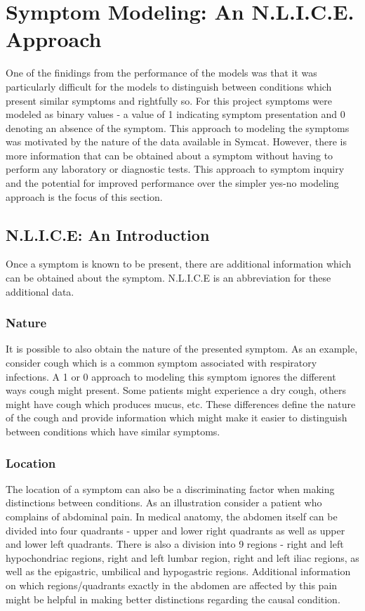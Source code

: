 \chapter{Symptom Modeling: An N.L.I.C.E. Approach} \label{appendix: b}

One of the finidings from the performance of the models was that it was particularly difficult for the models to distinguish between conditions which present similar symptoms and rightfully so. For this project symptoms were modeled as binary values - a value of 1 indicating symptom presentation and 0 denoting an absence of the symptom. This approach to modeling the symptoms was motivated by the nature of the data available in Symcat. However, there is more information that can be obtained about a symptom without having to perform any laboratory or diagnostic tests. This approach to symptom  inquiry and the potential for improved performance over the simpler yes-no modeling approach is the focus of this section.

\section{N.L.I.C.E: An Introduction}

Once a symptom is known to be present, there are additional information which can be obtained  about the symptom. N.L.I.C.E is an abbreviation for these additional data.

\subsection * {Nature}

It is possible to also obtain the nature of the presented symptom. As an example, consider cough which is a common symptom associated with respiratory infections. A 1 or 0 approach to modeling this symptom ignores the different ways cough might present. Some patients might experience a dry cough, others might have cough which produces mucus, etc. These differences define the nature of the cough and provide information which might make it easier to distinguish between conditions which have similar symptoms.

\subsection* {Location}

The location of a symptom can also be a discriminating factor when making distinctions between conditions. As an illustration consider a patient who complains of abdominal pain. In medical anatomy, the abdomen itself can be divided into four quadrants - upper and lower right quadrants as well as upper and lower left quadrants. There is also a division into 9 regions - right and left hypochondriac regions, right and left lumbar region, right and left iliac regions, as well as the epigastric, umbilical and hypogastric regions. Additional information on which regions/quadrants exactly in the abdomen are affected by this pain might be helpful in making better distinctions regarding the causal condition.

